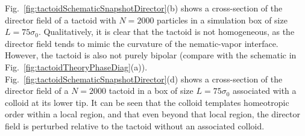 \documentclass[%
 aip,
 amsmath,amssymb,
 reprint,%
]{revtex4-1}
\begin{document}
Fig.~\ref{fig:tactoidSchematicSnapshotDirector}(b) shows a cross-section of the director field of a tactoid with $N=2000$ particles in a simulation box of size $L=75\sigma_0$. Qualitatively, it is clear that the tactoid is not homogeneous, as the director field tends to mimic the curvature of the nematic-vapor interface. However, the tactoid is also not purely bipolar (compare with the schematic in Fig.~\ref{fig:tactoidTheoryPhaseDiag}(a)). Fig.~\ref{fig:tactoidSchematicSnapshotDirector}(d) shows a cross-section of the director field of a $N=2000$ tactoid in a box of size $L=75\sigma_0 $ associated with a colloid at its lower tip. It can be seen that the colloid templates homeotropic order within a local region, and that even beyond that local region, the director field is perturbed relative to the tactoid without an associated colloid.
\end{document}
